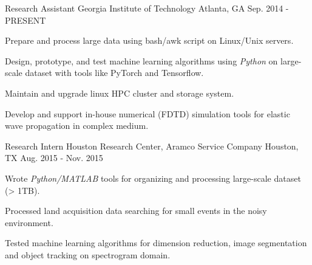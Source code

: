 

\begin{cventries}

  \cventry
    {Research Assistant} %
    {Georgia Institute of Technology} %
    {Atlanta, GA} %
    {Sep. 2014 - PRESENT} %
    {
      \begin{cvitems} %
        \item {Prepare and process large data using bash/awk script on Linux/Unix servers.}        
        \item {Design, prototype, and test machine learning algorithms using \textit{Python} on large-scale dataset with tools like PyTorch and Tensorflow.}
        \item {Maintain and upgrade linux HPC cluster and storage system.}
        \item {Develop and support in-house numerical (FDTD) simulation tools for elastic wave propagation in complex medium.}
      \end{cvitems}
    }

  \cventry
    {Research Intern} %
    {Houston Research Center, Aramco Service Company} %
    {Houston, TX} %
    {Aug. 2015 - Nov. 2015} %
    {
      \begin{cvitems} %
        \item {Wrote \textit{Python/MATLAB} tools for organizing and processing large-scale dataset (> 1TB).}
        \item {Processed land acquisition data searching for small events in the noisy environment.}
        \item {Tested machine learning algorithms for dimension reduction, image segmentation and object tracking on spectrogram domain.}
      \end{cvitems}
    }


\end{cventries}
